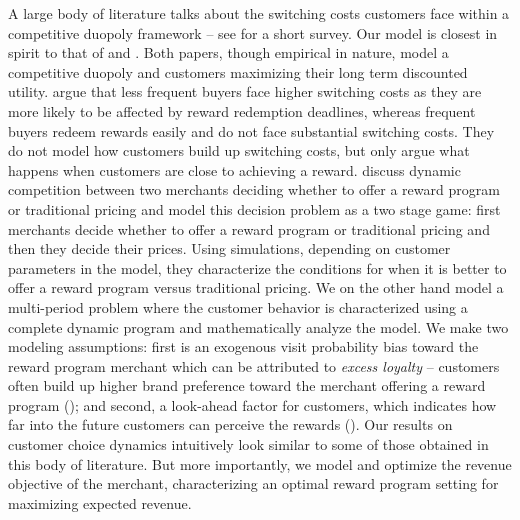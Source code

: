 A large body of literature talks about the switching costs customers face within a competitive duopoly framework -- see \cite{villas2015short} for a short survey.
Our model is closest in spirit to that of \cite{hartmann2008frequency} and \cite{kopalle2001economic}.
Both papers, though empirical in nature, model a competitive duopoly and customers maximizing their long term discounted utility.
\cite{hartmann2008frequency} argue that less frequent buyers face higher switching costs as they are more likely to be affected by reward redemption deadlines, whereas frequent buyers redeem rewards easily and do not face substantial switching costs. 
They do not model how customers build up switching costs, but only argue what happens when customers are close to achieving a reward.
\cite{kopalle2001economic} discuss dynamic competition between two merchants deciding whether to offer a reward program or traditional pricing and model this decision problem as a two stage game: first merchants decide whether to offer a reward program or traditional pricing and then they decide their prices. 
Using simulations, depending on customer parameters in the model, they characterize the conditions for when it is better to offer a reward program versus traditional pricing.
We on the other hand model a multi-period problem where the customer behavior is characterized using a complete dynamic program and mathematically analyze the model.
We make two modeling assumptions: first is an exogenous visit probability bias toward the reward program merchant which can be attributed to \emph{excess loyalty} -- customers often build up higher brand preference toward the merchant offering a reward program (\cite{fader1993excess, sharp1997loyalty}); 
and second, a look-ahead factor for customers, which indicates how far into the future customers can perceive the rewards (\cite{liu2007long,lewis2004influence}).
Our results on customer choice dynamics intuitively look similar to some of those obtained in this body of literature.
But more importantly, we model and optimize the revenue objective of the merchant, characterizing an optimal reward program setting for maximizing expected revenue.

